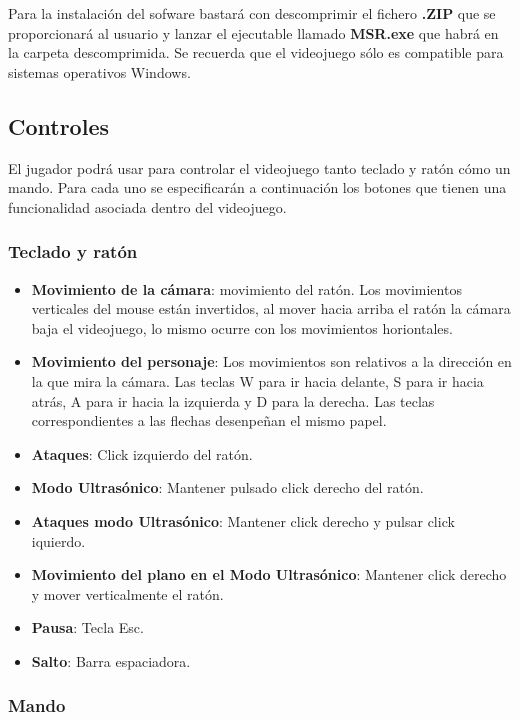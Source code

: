 Para la instalación del sofware bastará con descomprimir el fichero \textbf{.ZIP} que se proporcionará al usuario y lanzar el ejecutable llamado \textbf{MSR.exe} que habrá en la carpeta descomprimida. Se recuerda que el videojuego sólo es compatible para sistemas operativos Windows.

\subsection{Controles}

El jugador podrá usar para controlar el videojuego tanto teclado y ratón cómo un mando. Para cada uno se especificarán a continuación los botones que tienen una funcionalidad asociada dentro del videojuego.

\subsubsection{Teclado y ratón}


\begin{itemize}    
    \item \textbf{Movimiento de la cámara}:  movimiento del ratón. Los movimientos verticales del mouse están invertidos, al mover hacia arriba el ratón la cámara baja el videojuego, lo mismo ocurre con los movimientos horiontales.
    \item \textbf{Movimiento del personaje}: Los movimientos son relativos a la dirección en la que mira la cámara. Las teclas W para ir hacia delante, S para ir hacia atrás, A para ir hacia la izquierda y D para la derecha. Las teclas correspondientes a las flechas desenpeñan el mismo papel.
    \item \textbf{Ataques}: Click izquierdo del ratón.
    \item \textbf{Modo Ultrasónico}: Mantener pulsado click derecho del ratón.
    \item \textbf{Ataques modo Ultrasónico}: Mantener click derecho y pulsar click iquierdo.
    \item \textbf{Movimiento del plano en el Modo Ultrasónico}: Mantener click derecho y mover verticalmente el ratón.
    \item \textbf{Pausa}: Tecla Esc.
    \item \textbf{Salto}: Barra espaciadora.
\end{itemize}

\subsubsection{Mando}

